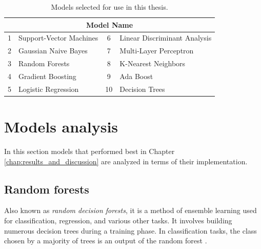         \begin{table}[htbp]
            \centering
            \begin{tabular}{@{}clcl@{}}
                \toprule
                \multicolumn{4}{c}{\textbf{Model Name}} \\
                \midrule
                1 & Support-Vector Machines & 6 & Linear Discriminant Analysis \\
                2 & Gaussian Naive Bayes & 7 & Multi-Layer Perceptron \\
                3 & Random Forests & 8 & K-Nearest Neighbors \\
                4 & Gradient Boosting & 9 & Ada Boost \\
                5 & Logistic Regression & 10 & Decision Trees \\
                \bottomrule
            \end{tabular}
            \caption{Models selected for use in this thesis.}
            \label{tab:movements_table}
        \end{table}
    
    \section{Models analysis}
        
        In this section models that performed best in Chapter \ref{chap:results_and_discussion} are analyzed in terms of their implementation.

        \subsection{Random forests}
           Also known as \textit{random decision forests}, it is a method of ensemble learning used for classification, regression, and various other tasks. It involves building numerous decision trees during a training phase. In classification tasks, the class chosen by a majority of trees is an output of the random forest \cite{ho_random_1998}.

